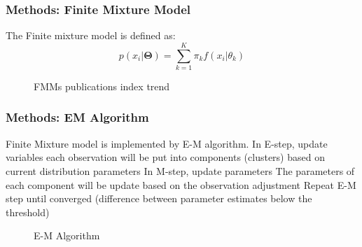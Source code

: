 \documentclass[xcolor=svgnames]{beamer}
\begin{document}
\begin{frame}\frametitle{Methods: Finite Mixture Model}

  The Finite mixture model is defined as:
\begin{equation}
p(x_i|\mathbf{\Theta}) = \sum_{k=1}^{K} \pi_k f(x_i|\theta_k)
\end{equation}

\begin{figure}
  \centering
  \caption{FMMs publications index trend~\cite{fmmtrend}}
\end{figure}

\end{frame}


\begin{frame}\frametitle{Methods: EM Algorithm}

  Finite Mixture model is implemented by E-M algorithm.
In E-step, update variables
each observation will be put into components (clusters) based on current distribution parameters
In M-step, update parameters
The parameters of each component will be update based on the observation adjustment
Repeat E-M step until converged (difference between parameter estimates below the threshold)


\begin{figure}
  \centering
  \caption{E-M Algorithm~\cite{phdthesis}}
\end{figure}

\end{frame}
\end{document}
